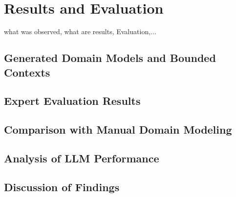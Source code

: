 \chapter{Results and Evaluation}
what was observed, what are results, Evaluation,...
\section{Generated Domain Models and Bounded Contexts}
\section{Expert Evaluation Results}
\section{Comparison with Manual Domain Modeling}
\section{Analysis of LLM Performance}
\section{Discussion of Findings}
